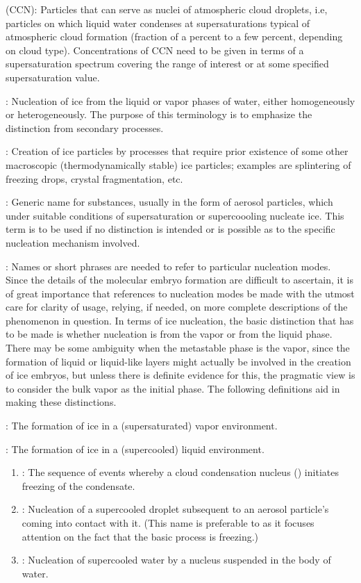 \documentclass[12pt,twoside]{book}
\begin{document}
 (CCN): Particles that can serve as
nuclei of atmospheric cloud droplets, i.e, particles on which liquid
water condenses at supersaturations typical of atmospheric cloud
formation (fraction of a percent to a few percent, depending on cloud
type). 
Concentrations of CCN need to be given in terms of a supersaturation
spectrum covering the range of interest or at some specified
supersaturation value. 

: Nucleation
of ice from the liquid or vapor phases of water, either homogeneously
or heterogeneously. 
The purpose of this terminology is to emphasize the distinction from
secondary processes.

: Creation
of ice particles by processes that require prior existence of some
other macroscopic (thermodynamically stable) ice particles; examples
are splintering of freezing drops, crystal fragmentation, etc.

: Generic name for substances, usually in the
form of aerosol particles, which under suitable conditions of
supersaturation or supercoooling nucleate ice.
This term is to be used if no distinction is intended or is possible
as to the specific nucleation mechanism involved.

: Names or short phrases are needed to
refer to particular nucleation modes.
Since the details of the molecular embryo formation are difficult to
ascertain, it is of great importance that references to nucleation
modes be made with the utmost care for clarity of usage, relying, if
needed, on more complete descriptions of the phenomenon in question.
In terms of ice nucleation, the basic distinction that has to be made
is whether nucleation is from the vapor or from the liquid phase.
There may be some ambiguity when the metastable phase is the vapor,
since the formation of liquid or liquid-like layers might actually be
involved in the creation of ice embryos, but unless there is definite
evidence for this, the pragmatic view is to consider the bulk vapor as
the initial phase.
The following definitions aid in making these distinctions.

: The formation of ice in a
(supersaturated) vapor environment. 

: The formation of ice in a (supercooled) 
liquid environment.
\begin{enumerate}
\item {}: The sequence of events whereby a
cloud condensation nucleus () initiates freezing of the
condensate.
\item {}: Nucleation of a supercooled droplet
subsequent to an aerosol particle's coming into contact with it.
(This name is preferable to  as it focuses
attention on the fact that the basic process is freezing.)
\item {}: Nucleation of supercooled water by
a nucleus suspended in the body of water.
\end{enumerate}
\end{document}
